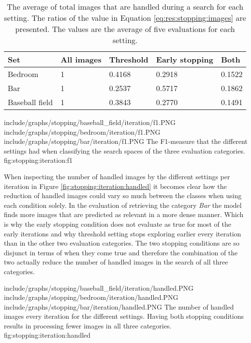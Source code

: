 \begin{table}
\centering
\begin{tabular}{l | p{2.6cm} p{2.6cm} p{3.2cm} p{1.6cm} }
\textbf{Set} & \textbf{All images} & \textbf{Threshold} & \textbf{Early stopping} & \textbf{Both} \\\hline
Bedroom & 1 & 0.4168 & 0.2918 & 0.1522 \\
Bar & 1 & 0.2537 & 0.5717 & 0.1862 \\
Baseball field & 1 & 0.3843 & 0.2770 & 0.1491 
\end{tabular}
\caption{The average of total images that are handled during a search for each setting. The ratios of the value in Equation \ref{eq:res:stopping:images} are presented. The values are the average of five evaluations for each setting.}
\label{table:res:stopping:images}
\end{table}

\tripfigurenear
{include/graphs/stopping/baseball_field/iteration/f1.PNG}
{include/graphs/stopping/bedroom/iteration/f1.PNG}
{include/graphs/stopping/bar/iteration/f1.PNG}
{The F1-measure that the different settings had when classifying the search spaces of the three evaluation categories.}
{fig:stopping:iteration:f1}

When inspecting the number of handled images by the different settings per iteration in Figure \ref{fig:stopping:iteration:handled} it becomes clear how the reduction of handled images could vary so much between the classes when using each condition solely. In the evaluation of retrieving the category \emph{Bar} the model finds more images that are predicted as relevant in a more dense manner. Which is why the early stopping condition does not evaluate as true for most of the early iterations and why threshold setting stops exploring earlier every iteration than in the other two evaluation categories. The two stopping conditions are so disjunct in terms of when they come true and therefore the combination of the two actually reduce the number of handled images in the search of all three categories. 

\tripfigurenear
{include/graphs/stopping/baseball_field/iteration/handled.PNG}
{include/graphs/stopping/bedroom/iteration/handled.PNG}
{include/graphs/stopping/bar/iteration/handled.PNG}
{The number of handled images every iteration for the different settings. Having both stopping conditions results in processing fewer images in all three categories.}
{fig:stopping:iteration:handled}


